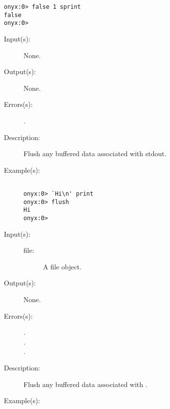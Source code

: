 \begin{description}
\begin{description}
\begin{verbatim}
onyx:0> false 1 sprint
false
onyx:0>
		\end{verbatim}
	\end{description}
\label{systemdict:flush}
\item[{\onyxop{--}{flush}{--}}: ]
	\begin{description}\item[]
	\item[Input(s): ] None.
	\item[Output(s): ] None.
	\item[Errors(s): ]
		\begin{description}\item[]
		\item[.]
		\end{description}
	\item[Description: ]
		Flush any buffered data associated with stdout.
	\item[Example(s): ]\begin{verbatim}

onyx:0> `Hi\n' print
onyx:0> flush
Hi
onyx:0>
		\end{verbatim}
	\end{description}
\label{systemdict:flushfile}
\item[{\onyxop{file}{flushfile}{--}}: ]
	\begin{description}\item[]
	\item[Input(s): ]
		\begin{description}\item[]
		\item[file: ]
			A file object.
		\end{description}
	\item[Output(s): ] None.
	\item[Errors(s): ]
		\begin{description}\item[]
		\item[.]
		\item[.]
		\item[.]
		\end{description}
	\item[Description: ]
		Flush any buffered data associated with .
	\item[Example(s): ]\begin{verbatim}


\end{verbatim}
\end{description}
\end{description}
